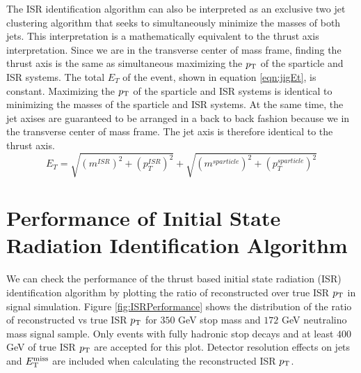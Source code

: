 \indent The ISR identification algorithm can also be interpreted as an exclusive two jet clustering algorithm that seeks to simultaneously minimize the masses of both jets.  This interpretation is a mathematically equivalent to the thrust axis interpretation.  Since we are in the transverse center of mass frame, finding the thrust axis is the same as simultaneous maximizing the $p_{\mathrm{T}}$ of the sparticle and ISR systems.  The total $E_T$ of the event, shown in equation \ref{eqn:jigEt}, is constant.  Maximizing the $p_{\mathrm{T}}$ of the sparticle and ISR systems is identical to minimizing the masses of the sparticle and ISR systems.  At the same time, the jet axises are guaranteed to be arranged in a back to back fashion because we in the transverse center of mass frame.  The jet axis is therefore identical to the thrust axis. \\

\begin{equation}
\label{eqn:jigEt}
E_T = \sqrt{(m^{ISR})^2+(p^{ISR}_{T})^2} + \sqrt{(m^{sparticle})^2+(p^{sparticle}_{T})^2}
\end{equation}

\section{Performance of Initial State Radiation Identification Algorithm}
\label{Jigsaw:Performance}

\indent We can check the performance of the thrust based initial state radiation (ISR) identification algorithm by plotting the ratio of reconstructed over true ISR $p_{\mathrm{T}}$ in signal simulation.  Figure \ref{fig:ISRPerformance} shows the distribution of the ratio of reconstructed vs true ISR $p_{\mathrm{T}}$ for $350$ GeV stop mass and $172$ GeV neutralino mass signal sample.  Only events with fully hadronic stop decays and at least $400$ GeV of true ISR $p_{\mathrm{T}}$ are accepted for this plot.  Detector resolution effects on jets and $E_{\mathrm{T}}^{\mathrm{miss}}$ are included when calculating the reconstructed ISR $p_{\mathrm{T}}$.

